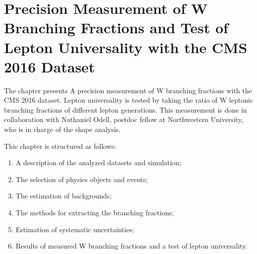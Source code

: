 \chapter{Precision Measurement of W Branching Fractions and Test of Lepton Universality with the CMS 2016 Dataset}
\label{sec:analysis}


The chapter presents A precision measurement of W branching fractions with the CMS 2016 dataset. Lepton universality is tested by taking the ratio of W leptonic branching fractions of different lepton generations. This measurement is done in collaboration with Nathaniel Odell, postdoc fellow at Northwestern University, who is in charge of the shape analysis. 


This chapter is structured as follows:

\begin{enumerate}
    \item A description of the analyzed datasets and simulation;
    \item The selection of physics objects and events;
    \item The estimation of backgrounds;
    \item The methods for extracting the branching fractions;
    \item Estimation of systematic uncertainties;
    \item Results of measured W branching fractions and a test of lepton universality.
\end{enumerate}
    
    
% 

% 
% 
% 
% 
% 





